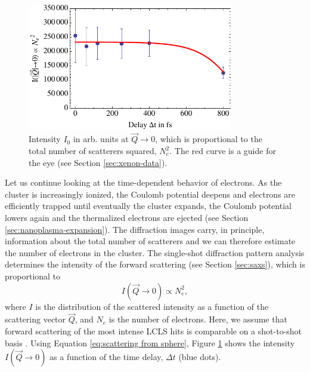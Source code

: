 \begin{figure}
	\centering
		\includegraphics[width=0.80\textwidth]{images/results/number-of-scatterers.pdf}
	\caption[Time-resolved behavior of number of scatterers due to nanoplasma expansion]{Intensity $I_{0}$ in arb. units at $\vec{Q}\rightarrow 0$, which is proportional to the total number of scatterers squared, $N_{e}^{2}$. The red curve is a guide for the eye (see Section \ref{sec:xenon-data}).}
	\label{fig:number-of-scatterer}
\end{figure}
%
Let us continue looking at the time-dependent behavior of electrons. As the cluster is increasingly ionized, the Coulomb potential deepens and electrons are efficiently trapped until eventually the cluster expands, the Coulomb potential lowers again and the thermalized electrons are ejected (see Section \ref{sec:nanoplasma-expansion}). The diffraction images carry, in principle, information about the total number of scatterers and we can therefore estimate the number of electrons in the cluster. The single-shot diffraction pattern analysis determines the intensity of the forward scattering (see Section \ref{sec:saxs}), which is proportional to
\begin{equation}{}
I\left(\vec{Q}\rightarrow 0\right) \propto N_{e}^{2},
\label{eq:intensity-prop-to-electrons}
\end{equation}
where $I$ is the distribution of the scattered intensity as a function of the scattering vector $\vec{Q}$, and $N_{e}$ is the number of electrons. Here, we assume that forward scattering of the most intense LCLS hits is comparable on a shot-to-shot basis \cite{Gorkhover-2012-PRL}. Using Equation \eqref{eq:scattering from sphere}, Figure \ref{fig:number-of-scatterer} shows the intensity $I\left(\vec{Q}\rightarrow 0\right)$ as a function of the time delay, $\Delta t$ (blue dots).
